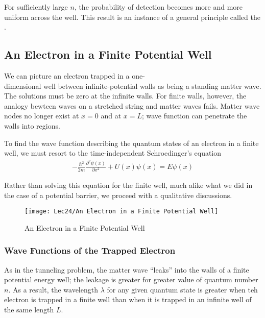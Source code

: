 For sufficiently large $n$, the probability of detection becomes more and more uniform across the well. This result is an instance of a general principle called the . 

\subsection{An Electron in a Finite Potential Well}
We can picture an electron trapped in a one-\\dimensional well between infinite-potential walls as being a standing matter wave. The solutions must be zero at the infinite walls. For finite walls, however, the analogy bewteen waves on a stretched string and matter waves fails. Matter wave nodes no longer exist at $x=0$ and at $x=L$; wave function can penetrate the walls into  regions. 

To find the wave function describing the quantum states of an electron in a finite well, we must resort to the time-independent Schroedinger's equation
\begin{align*}
    -\frac{\hbar^2}{2m}\frac{\partial^2\psi(x)}{\partial x^2}+U(x)\psi(x)=E\psi(x)
\end{align*}

Rather than solving this equation for the finite well, much alike what we did in the case of a potential barrier, we proceed with a qualitative discussions. 

\begin{figure}[H]
    \centering
    \texttt{[image: Lec24/An Electron in a Finite Potential Well]}
    \caption{An Electron in a Finite Potential Well}
\end{figure}

\subsubsection[Wave Functions of the Trapped Ele-ctron]{Wave Functions of the Trapped Electron}
As in the tunneling problem, the matter wave ``leaks'' into the walls of a finite potential energy well; the leakage is greater for greater value of quantum number $n$. As a result, the wavelength $\lambda$ for any given quantum state is greater when teh electron is trapped in a finite well than when it is trapped in an infinite well of the same length $L$. 


